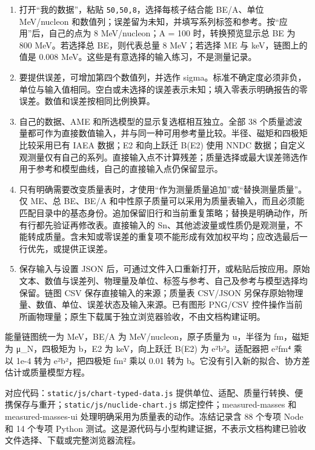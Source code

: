 \documentclass[
  11pt,
  letterpaper,
]{article}
\providecommand{\tightlist}{%
  \setlength{\itemsep}{0pt}\setlength{\parskip}{0pt}}
\begin{document}
\begin{enumerate}
\def\labelenumi{\arabic{enumi}.}
\tightlist
\item
  打开``我的数据''，粘贴 \texttt{50,50,8}，选择每核子结合能 BE/A、单位
  MeV/nucleon
  和数值列；误差留为未知，并填写系列标签和参考。按``应用''后，自己的点为
  8 MeV/nucleon；A = 100 时，转换预览显示总 BE 为 800 MeV。若选择总
  BE，则代表总量 8 MeV；若选择 ME 与 keV，链图上的值是 0.008
  MeV。这些是有意选择的输入练习，不是测量记录。
\item
  要提供误差，可增加第四个数值列，并选作
  sigma。标准不确定度必须非负，单位与输入值相同。空白或未选择的误差表示未知；填入零表示明确报告的零误差。数值和误差按相同比例换算。
\item
  自己的数据、AME 和所选模型的显示复选框相互独立。全部 38
  个质量滤波量都可作为直接数值输入，并与同一种可用参考量比较。半径、磁矩和四极矩比较采用已有
  IAEA 数据；E2 和向上跃迁 B(E2) 使用 NNDC
  数据；自定义观测量仅有自己的系列。直接输入点不计算残差；质量选择或最大误差筛选作用于参考和模型曲线，自己的直接输入点仍保留显示。
\item
  只有明确需要改变质量表时，才使用``作为测量质量追加''或``替换测量质量''。仅
  ME、总 BE、BE/A
  和中性原子质量可以采用为质量表输入，而且必须能匹配目录中的基态身份。追加保留旧行和当前重复策略；替换是明确动作，所有行都先验证再修改表。直接输入的
  Sn、其他滤波量或性质仍是观测量，不能转成质量。含未知或零误差的重复项不能形成有效加权平均；应改选最后一行优先，或提供正误差。
\item
  保存输入与设置 JSON
  后，可通过文件入口重新打开，或粘贴后按应用。原始文本、数值与误差列、物理量及单位、标签与参考、自己及参考与模型选择均保留。链图
  CSV 保存直接输入的来源；质量表 CSV/JSON
  另保存原始物理量、数值、单位、误差状态及输入来源。已有图形 PNG/CSV
  控件操作当前所画物理量；原生下载属于独立浏览器验收，不由文档构建证明。
\end{enumerate}

能量链图统一为 MeV，BE/A 为 MeV/nucleon，原子质量为 u，半径为 fm，磁矩为
μ\_N，四极矩为 b，E2 为 keV，向上跃迁 B(E2) 为 e²b²。适配器把 e²fm⁴ 乘以
1e-4 转为 e²b²，把四极矩 fm² 乘以 0.01 转为
b。它没有引入新的拟合、协方差估计或质量模型方程。

对应代码：\texttt{static/js/chart-typed-data.js}
提供单位、适配、质量行转换、便携保存与重开；\texttt{static/js/nuclide-chart.js}
绑定控件；measured-masses 和 measured-masses-ui
处理明确采用为质量表的动作。冻结记录含 88 个专项 Node 和 14 个专项
Python
测试。这是源代码与小型构建证据，不表示文档构建已验收文件选择、下载或完整浏览器流程。
\end{document}
